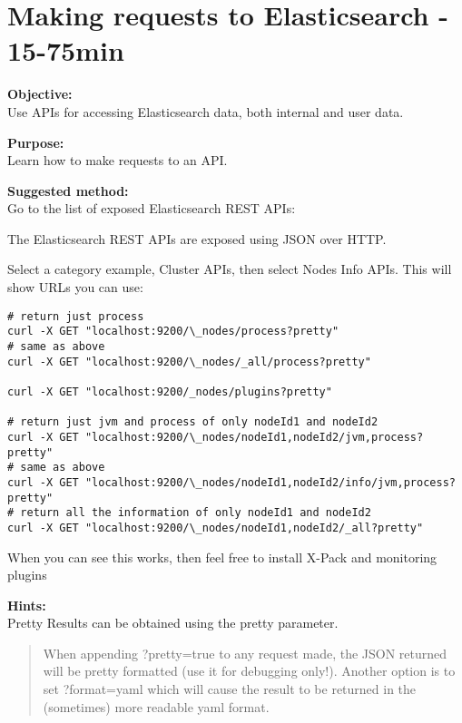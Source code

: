 \documentclass[a4paper,11pt,notitlepage]{report}
\begin{document}
\chapter{Making requests to Elasticsearch - 15-75min}
\label{ex:es-rest-api}


{\bf Objective:}\\
Use APIs for accessing Elasticsearch data, both internal and user data.

{\bf Purpose:}\\
Learn how to make requests to an API.

{\bf Suggested method:}\\
Go to the list of exposed Elasticsearch REST APIs:\\

The Elasticsearch REST APIs are exposed using JSON over HTTP.

Select a category example, Cluster APIs, then select Nodes Info APIs. This will show URLs you can use:

\begin{verbatim}
# return just process
curl -X GET "localhost:9200/\_nodes/process?pretty"
# same as above
curl -X GET "localhost:9200/\_nodes/_all/process?pretty"

curl -X GET "localhost:9200/_nodes/plugins?pretty"

# return just jvm and process of only nodeId1 and nodeId2
curl -X GET "localhost:9200/\_nodes/nodeId1,nodeId2/jvm,process?pretty"
# same as above
curl -X GET "localhost:9200/\_nodes/nodeId1,nodeId2/info/jvm,process?pretty"
# return all the information of only nodeId1 and nodeId2
curl -X GET "localhost:9200/\_nodes/nodeId1,nodeId2/_all?pretty"
\end{verbatim}

When you can see this works, then feel free to install X-Pack and monitoring plugins

{\bf Hints:}\\
Pretty Results can be obtained using the pretty parameter.
\begin{quote}
When appending ?pretty=true to any request made, the JSON returned will be pretty formatted (use it for debugging only!). Another option is to set ?format=yaml which will cause the result to be returned in the (sometimes) more readable yaml format.
\end{quote}
\end{document}
